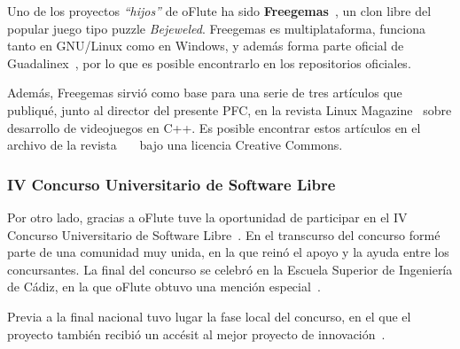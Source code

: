 \documentclass[a4paper,11pt]{article}
\begin{document}
Uno de los proyectos \textit{``hijos''} de oFlute ha sido
\textbf{Freegemas}~\cite{freegemas}, un clon libre del popular juego tipo puzzle
\textit{Bejeweled}. Freegemas es multiplataforma, funciona tanto en GNU/Linux
como en Windows, y además forma parte oficial de Guadalinex~\cite{guadalinex},
por lo que es posible encontrarlo en los repositorios oficiales.

Además, Freegemas sirvió como base para una serie de tres artículos que
publiqué, junto al director del presente PFC, en la revista Linux
Magazine~\cite{linuxmagazine} sobre desarrollo de videojuegos en C++. Es posible
encontrar estos artículos en el archivo de la
revista~\cite{refarticulo1}~\cite{refarticulo2}~\cite{refarticulo3} bajo una
licencia Creative Commons.

\subsubsection{IV Concurso Universitario de Software Libre}

Por otro lado, gracias a oFlute tuve la oportunidad de participar en el IV
Concurso Universitario de Software Libre~\cite{cusl}. En el transcurso del
concurso formé parte de una comunidad muy unida, en la que reinó el apoyo y la
ayuda entre los concursantes. La final del concurso se celebró en la Escuela
Superior de Ingeniería de Cádiz, en la que oFlute obtuvo una mención
especial~\cite{cusl2}.

Previa a la final nacional tuvo lugar la fase local del concurso, en el que el
proyecto también recibió un accésit al mejor proyecto de
innovación~\cite{cusllocal}.



\end{document}

